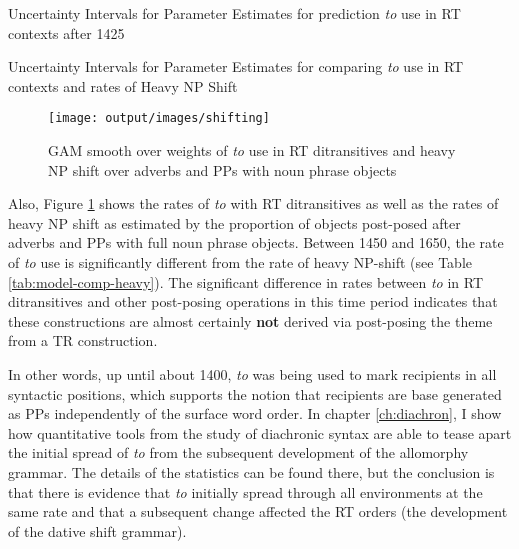 \begin{table}[ht!]
	\RawFloats
	
	\caption{Uncertainty Intervals for Parameter Estimates for prediction \textit{to} use in RT contexts after 1425}
	\label{tab:model-comp-weight}
	
	\caption{Uncertainty Intervals for Parameter Estimates for comparing \textit{to} use in RT contexts and rates of Heavy NP Shift}
	\label{tab:model-comp-heavy}
\end{table}

\begin{figure}[t!]
	\texttt{[image: output/images/shifting]}
	\caption{GAM smooth over weights of \textit{to} use in RT ditransitives and heavy NP shift over adverbs and PPs with noun phrase objects}
	\label{fig:shifting}
\end{figure}

Also, Figure \ref{fig:shifting} shows the rates of \textit{to} with RT ditransitives as well as the rates of heavy NP shift as estimated by the proportion of objects post-posed after adverbs and PPs with full noun phrase objects. Between 1450 and 1650, the rate of \textit{to} use is significantly different from the rate of heavy NP-shift (see Table \ref{tab:model-comp-heavy}). The significant difference in rates between \textit{to} in RT ditransitives and other post-posing operations in this time period indicates that these constructions are almost certainly \textbf{not} derived via post-posing the theme from a TR construction.

In other words, up until about 1400, \textit{to} was being used to mark recipients in all syntactic positions, which supports the notion that recipients are base generated as PPs independently of the surface word order. In chapter \ref{ch:diachron}, I show how quantitative tools from the study of diachronic syntax are able to tease apart the initial spread of \textit{to} from the subsequent development of the allomorphy grammar. The details of the statistics can be found there, but the conclusion is that there is evidence that \textit{to} initially spread through all environments at the same rate and that a subsequent change affected the RT orders (the development of the dative shift grammar).

